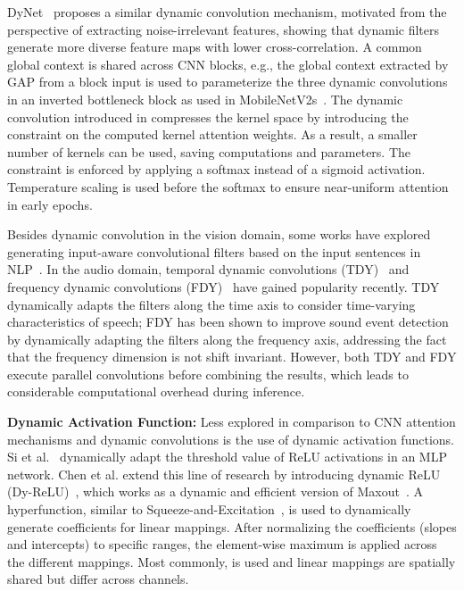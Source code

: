 \documentclass[lettersize,journal]{IEEEtran}
\begin{document}
DyNet~\cite{zhang2020dynet} proposes a similar dynamic convolution mechanism, motivated from the perspective of extracting noise-irrelevant features, showing that dynamic filters generate more diverse feature maps with lower cross-correlation. A common global context is shared across CNN blocks, e.g., the global context extracted by GAP from a block input is used to parameterize the three dynamic convolutions in an inverted bottleneck block as used in MobileNetV2s~\cite{Sandler18MobileNetsV2}.
The dynamic convolution introduced in \cite{chen2020dynamic_conv} compresses the kernel space by introducing the constraint  on the computed kernel attention weights. As a result, a smaller number of kernels  can be used, saving computations and parameters. The constraint is enforced by applying a softmax instead of a sigmoid activation. Temperature scaling is used before the softmax to ensure near-uniform attention in early epochs. 

Besides dynamic convolution in the vision domain, some works have explored generating input-aware convolutional filters based on the input sentences in NLP~\cite{wu2019dynamic_conv_pay, shen2017learning, gong2018convolutional}.  In the audio domain, temporal dynamic convolutions (TDY)~\cite{kim2022temporal} and frequency dynamic convolutions (FDY)~\cite{nam2022frequency} have gained popularity recently. TDY dynamically adapts the filters along the time axis to consider time-varying characteristics of speech;  FDY has been shown to improve sound event detection by dynamically adapting the filters along the frequency axis,  addressing the fact that the frequency dimension is not shift invariant. However, both TDY and FDY execute  parallel convolutions before combining the results, which leads to considerable computational overhead during inference.

\textbf{Dynamic Activation Function:}
Less explored in comparison to CNN attention mechanisms and dynamic convolutions is the use of dynamic activation functions. Si et al.~\cite{si2018dynamic} dynamically adapt the threshold value of ReLU activations in an MLP network. Chen et al. extend this line of research by introducing dynamic ReLU (Dy-ReLU)~\cite{chen2020dynamic_relu}, which works as a dynamic and efficient version of Maxout~\cite{goodfellow2013maxout}. A hyperfunction, similar to Squeeze-and-Excitation~\cite{Hu18Squeeze}, is used to dynamically generate coefficients for  linear mappings. After normalizing the coefficients (slopes and intercepts) to specific ranges, the element-wise maximum is applied across the  different mappings. Most commonly,  is used and linear mappings are spatially shared but differ across channels.  
\end{document}
